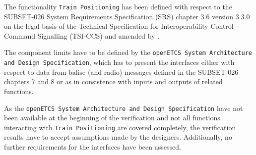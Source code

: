 The functionality \texttt{Train Positioning} has been defined with respect to the SUBSET-026 System Requirements Specification (SRS) \cite{SRS} chapter 3.6 version 3.3.0 on the legal basis of the Technical Specification for Interoperability Control Command Signalling (TSI-CCS) \cite{2012/88/EU} and amended by \cite{2012/696/EU}. 

The component limits have to be defined by the \texttt{openETCS System Architecture and Design Specification}, which has to present the interfaces either with respect to data from balise (and radio) messages defined in the SUBSET-026 chapters 7 and 8 or as in consistence with inputs and outputs of related functions. 

As the \texttt{openETCS System Architecture and Design Specification} have not been available at the beginning of the verification and not all functions interacting with \texttt{Train Positioning} are covered completely, the verification results have to accept assumptions made by the designers. Additionally, no further requirements for the interfaces have been assessed.